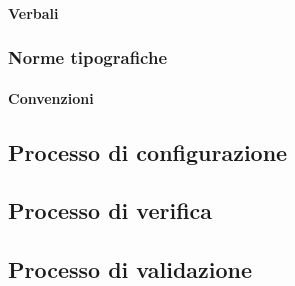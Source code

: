 \paragraph{Verbali}

\subsubsection{Norme tipografiche}

\paragraph{Convenzioni}





\subsection{Processo di configurazione}

\subsection{Processo di verifica}

\subsection{Processo di validazione}